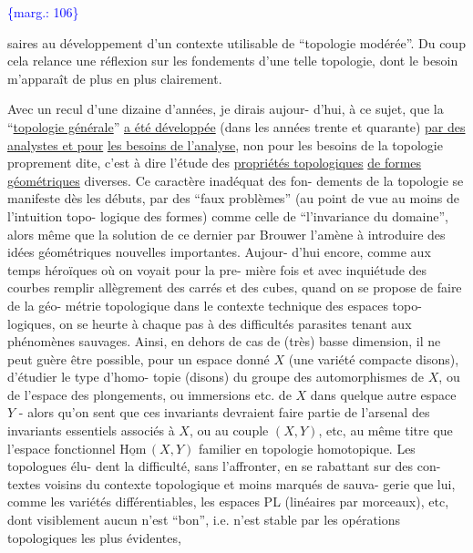 \documentclass[11pt]{article}
\newcommand{\scanpage}[1]{\par\bigskip\noindent{\small\sffamily[scan #1]}\par}
\newcommand{\mspage}[1]{{\small\sffamily[p.\,#1]}}
\newcommand{\margin}[1]{\textcolor{blue}{\{\textsf{marg.:} #1\}}}
\newcommand{\uline}[1]{\underline{#1}}
\begin{document}
\margin{106}

\clearpage
\scanpage{119/107}
\mspage{29}

saires au développement d'un contexte utilisable de ``topologie
modérée''. Du coup cela relance une réflexion sur les fondements
d'une telle topologie, dont le besoin m'apparaît de plus en plus
clairement.

Avec un recul d'une dizaine d'années, je dirais aujour-%
d'hui, à ce sujet, que la ``\uline{topologie générale}'' \uline{a été développée}
(dans les années trente et quarante) \uline{par des analystes et pour}
\uline{les besoins de l'analyse}, non pour les besoins de la topologie
proprement dite, c'est à dire l'étude des \uline{propriétés topologiques}
\uline{de formes géométriques} diverses. Ce caractère inadéquat des fon-%
dements de la topologie se manifeste dès les débuts, par des
``faux problèmes'' (au point de vue au moins de l'intuition topo-%
logique des formes) comme celle de ``l'invariance du domaine'',
alors même que la solution de ce dernier par Brouwer l'amène à
introduire des idées géométriques nouvelles importantes. Aujour-%
d'hui encore, comme aux temps héroïques où on voyait pour la pre-%
mière fois et avec inquiétude des courbes remplir allègrement
des carrés et des cubes, quand on se propose de faire de la géo-%
métrie topologique dans le contexte technique des espaces topo-%
logiques, on se heurte à chaque pas à des difficultés parasites
tenant aux phénomènes sauvages. Ainsi, en dehors de cas de (très)
basse dimension, il ne peut guère être possible, pour un espace
donné $X$ (une variété compacte disons), d'étudier le type d'homo-%
topie (disons) du groupe des automorphismes de $X$, ou de l'espace
des plongements, ou immersions etc. de $X$ dans quelque autre
espace $Y$ - alors qu'on sent que ces invariants devraient faire
partie de l'arsenal des invariants essentiels associés à $X$, ou
au couple $(X,Y)$, etc, au même titre que l'espace fonctionnel
$\underline{\mathrm{Hom}}\,(X,Y)$ familier en topologie homotopique. Les topologues élu-%
dent la difficulté, sans l'affronter, en se rabattant sur des con-%
textes voisins du contexte topologique et moins marqués de sauva-%
gerie que lui, comme les variétés différentiables, les espaces PL
(linéaires par morceaux), etc, dont visiblement aucun n'est ``bon'',
i.e. n'est stable par les opérations topologiques les plus évidentes,
\end{document}
